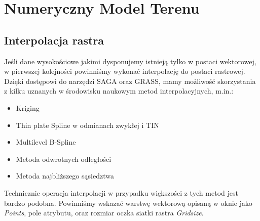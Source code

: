 \documentclass[12pt,a4paper]{book}
\begin{document}
\section{Numeryczny Model Terenu}
\subsection{Interpolacja rastra}
Jeśli dane wysokościowe jakimi dysponujemy istnieją tylko w postaci wektorowej, w pierwszej kolejności powinniśmy wykonać interpolację do postaci rastrowej. Dzięki dostępowi do narzędzi SAGA oraz GRASS, mamy możliwość skorzystania z kilku uznanych w środowisku naukowym metod interpolacyjnych, m.in.:

\begin{itemize}
\item Kriging
\item Thin plate Spline w odmianach zwykłej i TIN
\item Multilevel B-Spline
\item Metoda odwrotnych odległości
\item Metoda najbliższego sąsiedztwa
\end{itemize}
Technicznie operacja interpolacji w przypadku większości z tych metod jest bardzo podobna. Powinniśmy wskazać warstwę wektorową opisaną w oknie jako \textit{Points}, pole atrybutu, oraz rozmiar oczka siatki rastra \textit{Gridsize}.
\end{document}
